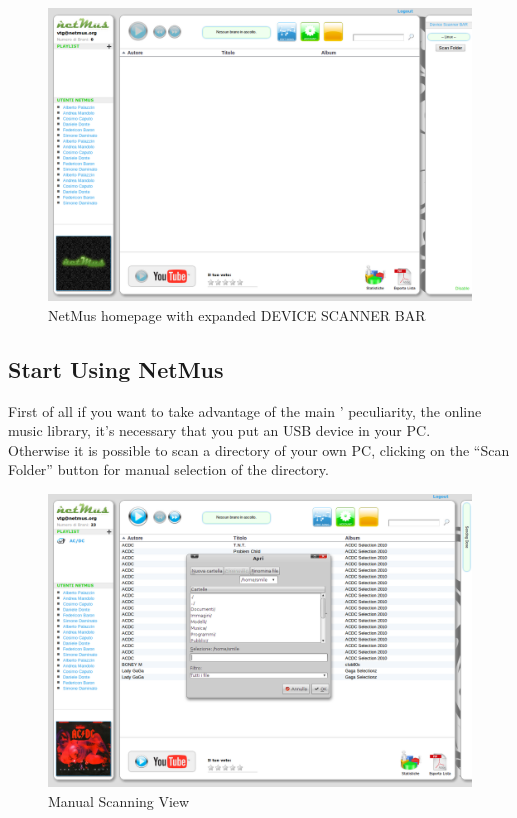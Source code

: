 \begin{figure}[htbp]
  \centering
  \includegraphics[width=15cm]{img/MU/applet_bar_open.png}
\caption{NetMus homepage with expanded DEVICE SCANNER BAR}
\end{figure}

\subsection{Start Using NetMus}

First of all if you want to take advantage of the main ' peculiarity,
the online music library, it's necessary that you put an USB device in your PC.\\
Otherwise it is possible to scan a directory of your own PC, clicking
on the ``Scan Folder'' button for manual selection of the directory.\\ 

\begin{figure}[htbp]
  \centering
  \includegraphics[width=15cm]{img/MU/scan_manual.png}
\caption{Manual Scanning View}
\end{figure}

